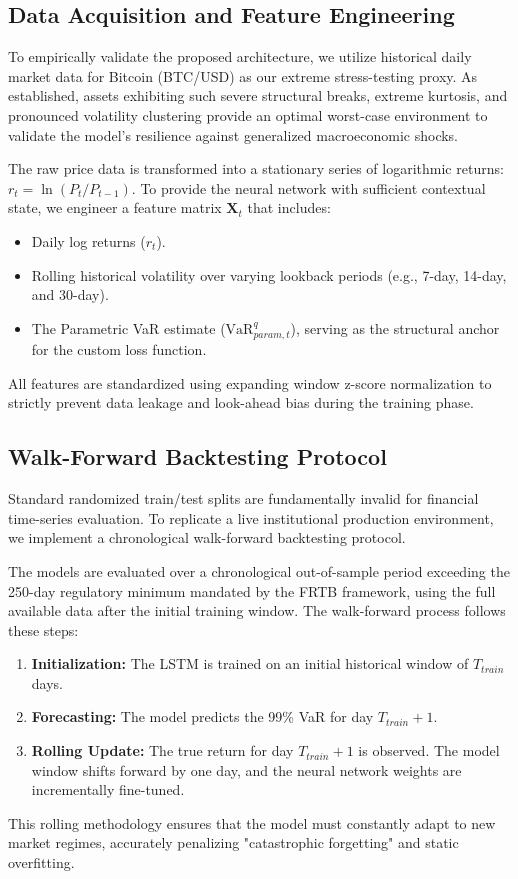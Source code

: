 
\subsection{Data Acquisition and Feature Engineering}
To empirically validate the proposed architecture, we utilize historical daily market data for Bitcoin (BTC/USD) as our extreme stress-testing proxy. As established, assets exhibiting such severe structural breaks, extreme kurtosis, and pronounced volatility clustering provide an optimal worst-case environment to validate the model's resilience against generalized macroeconomic shocks.

The raw price data is transformed into a stationary series of logarithmic returns: $r_t = \ln(P_t / P_{t-1})$. To provide the neural network with sufficient contextual state, we engineer a feature matrix $\bm{X}_t$ that includes:
\begin{itemize}
    \item Daily log returns ($r_t$).
    \item Rolling historical volatility over varying lookback periods (e.g., 7-day, 14-day, and 30-day).
    \item The Parametric VaR estimate ($\text{VaR}_{param, t}^q$), serving as the structural anchor for the custom loss function.
\end{itemize}
All features are standardized using expanding window z-score normalization to strictly prevent data leakage and look-ahead bias during the training phase.

\subsection{Walk-Forward Backtesting Protocol}
Standard randomized train/test splits are fundamentally invalid for financial time-series evaluation. To replicate a live institutional production environment, we implement a chronological walk-forward backtesting protocol. 

The models are evaluated over a chronological out-of-sample period exceeding the 250-day regulatory minimum mandated by the FRTB framework, using the full available data after the initial training window. The walk-forward process follows these steps:
\begin{enumerate}
    \item \textbf{Initialization:} The LSTM is trained on an initial historical window of $T_{train}$ days.
    \item \textbf{Forecasting:} The model predicts the 99\% VaR for day $T_{train} + 1$.
    \item \textbf{Rolling Update:} The true return for day $T_{train} + 1$ is observed. The model window shifts forward by one day, and the neural network weights are incrementally fine-tuned.
\end{enumerate}
This rolling methodology ensures that the model must constantly adapt to new market regimes, accurately penalizing "catastrophic forgetting" and static overfitting.


